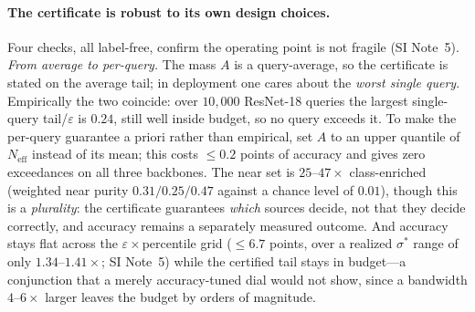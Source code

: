 \documentclass[10pt,twocolumn]{article}
\newcommand{\sstar}{\sigma^{*}}
\newcommand{\Neff}{N_{\mathrm{eff}}}
\begin{document}
\paragraph{The certificate is robust to its own design choices.} Four checks, all label-free, confirm the operating point is not fragile (SI Note~5). \emph{From average to per-query.} The mass $A$ is a query-average, so the certificate is stated on the average tail; in deployment one cares about the \emph{worst single query}. Empirically the two coincide: over $10{,}000$ ResNet-18 queries the largest single-query tail/$\varepsilon$ is $0.24$, still well inside budget, so no query exceeds it. To make the per-query guarantee a priori rather than empirical, set $A$ to an upper quantile of $\Neff$ instead of its mean; this costs $\le0.2$ points of accuracy and gives zero exceedances on all three backbones. The near set is $25$--$47\times$ class-enriched (weighted near purity $0.31/0.25/0.47$ against a chance level of $0.01$), though this is a \emph{plurality}: the certificate guarantees \emph{which} sources decide, not that they decide correctly, and accuracy remains a separately measured outcome. And accuracy stays flat across the $\varepsilon\times$percentile grid ($\le6.7$ points, over a realized $\sstar$ range of only $1.34$--$1.41\times$; SI Note~5) while the certified tail stays in budget---a conjunction that a merely accuracy-tuned dial would not show, since a bandwidth $4$--$6\times$ larger leaves the budget by orders of magnitude.
\end{document}
